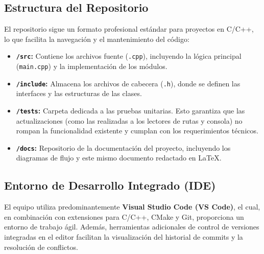 \documentclass[11pt,a4paper]{article}
\begin{document}
\subsection{Estructura del Repositorio}
El repositorio sigue un formato profesional estándar para proyectos en C/C++, lo que facilita la navegación y el mantenimiento del código:
\begin{itemize}
    \item \textbf{\texttt{/src}:} Contiene los archivos fuente (\texttt{.cpp}), incluyendo la lógica principal (\texttt{main.cpp}) y la implementación de los módulos.
    \item \textbf{\texttt{/include}:} Almacena los archivos de cabecera (\texttt{.h}), donde se definen las interfaces y las estructuras de las clases.
    \item \textbf{\texttt{/tests}:} Carpeta dedicada a las pruebas unitarias. Esto garantiza que las actualizaciones (como las realizadas a los lectores de rutas y consola) no rompan la funcionalidad existente y cumplan con los requerimientos técnicos.
    \item \textbf{\texttt{/docs}:} Repositorio de la documentación del proyecto, incluyendo los diagramas de flujo y este mismo documento redactado en LaTeX.
\end{itemize}

\subsection{Entorno de Desarrollo Integrado (IDE)}
El equipo utiliza predominantemente \textbf{Visual Studio Code (VS Code)}, el cual, en combinación con extensiones para C/C++, CMake y Git, proporciona un entorno de trabajo ágil. Además, herramientas adicionales de control de versiones integradas en el editor facilitan la visualización del historial de commits y la resolución de conflictos.
\end{document}
